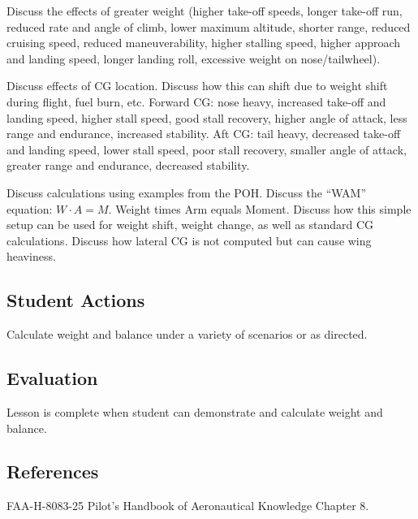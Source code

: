 Discuss the effects of greater weight (higher take-off speeds, longer take-off
run, reduced rate and angle of climb, lower maximum altitude, shorter range,
reduced cruising speed, reduced maneuverability, higher stalling speed, higher
approach and landing speed, longer landing roll, excessive weight on
nose/tailwheel).

Discuss effects of CG location. Discuss how this can shift due to weight shift
during flight, fuel burn, etc. Forward CG: nose heavy, increased take-off and
landing speed, higher stall speed, good stall recovery, higher angle of attack,
less range and endurance, increased stability. Aft CG: tail heavy, decreased
take-off and landing speed, lower stall speed, poor stall recovery, smaller
angle of attack, greater range and endurance, decreased stability.

Discuss calculations using examples from the POH. Discuss the ``WAM'' equation:
$W \cdot A = M$. Weight times Arm equals Moment. Discuss how this simple setup
can be used for weight shift, weight change, as well as standard CG
calculations.  Discuss how lateral CG is not computed but can cause wing
heaviness.

\subsection{Student Actions}

Calculate weight and balance under a variety of scenarios or as directed.

\subsection{Evaluation}

Lesson is complete when student can demonstrate and calculate weight and balance.

\subsection{References}

FAA-H-8083-25 Pilot's Handbook of Aeronautical Knowledge Chapter 8.

